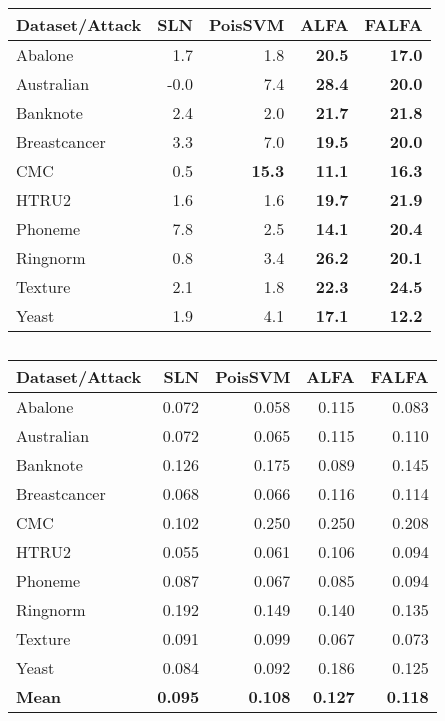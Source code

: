 \begin{table}
    \footnotesize
    \centering
    \caption{}
    \begin{tabular}{l|r|r|r|r}
    \toprule
        Dataset/Attack &  SLN &  PoisSVM &  ALFA &  FALFA \\
    \midrule
        Abalone    &   1.7 &      1.8          &  \textbf{20.5} &   \textbf{17.0} \\
        Australian &  -0.0 &      7.4          &  \textbf{28.4} &   \textbf{20.0} \\
          Banknote &   2.4 &      2.0          &  \textbf{21.7} &   \textbf{21.8} \\
      Breastcancer &   3.3 &      7.0          &  \textbf{19.5} &   \textbf{20.0} \\
               CMC &   0.5 &     \textbf{15.3} &  \textbf{11.1} &   \textbf{16.3} \\
             HTRU2 &   1.6 &      1.6          &  \textbf{19.7} &   \textbf{21.9} \\
           Phoneme &   7.8 &      2.5          &  \textbf{14.1} &   \textbf{20.4} \\
          Ringnorm &   0.8 &      3.4          &  \textbf{26.2} &   \textbf{20.1} \\
           Texture &   2.1 &      1.8          &  \textbf{22.3} &   \textbf{24.5} \\
             Yeast &   1.9 &      4.1          &  \textbf{17.1} &   \textbf{12.2} \\
    \bottomrule
    \end{tabular}
    \label{tab.err}
\end{table}


\begin{table}
    \footnotesize
    \centering
    \caption{}
    \begin{tabular}{l|r|r|r|r}
        \toprule
        Dataset/Attack &   SLN &  PoisSVM &  ALFA &  FALFA \\
        \midrule
               Abalone & 0.072 &    0.058 & 0.115 &  0.083 \\
            Australian & 0.072 &    0.065 & 0.115 &  0.110 \\
              Banknote & 0.126 &    0.175 & 0.089 &  0.145 \\
          Breastcancer & 0.068 &    0.066 & 0.116 &  0.114 \\
                   CMC & 0.102 &    0.250 & 0.250 &  0.208 \\
                 HTRU2 & 0.055 &    0.061 & 0.106 &  0.094 \\
               Phoneme & 0.087 &    0.067 & 0.085 &  0.094 \\
              Ringnorm & 0.192 &    0.149 & 0.140 &  0.135 \\
               Texture & 0.091 &    0.099 & 0.067 &  0.073 \\
                 Yeast & 0.084 &    0.092 & 0.186 &  0.125 \\
        \midrule
        \textbf{Mean} & \textbf{0.095} & \textbf{0.108} & \textbf{0.127} & \textbf{0.118} \\
        \bottomrule
        \end{tabular}
    \label{table.real_rmse}
\end{table}
